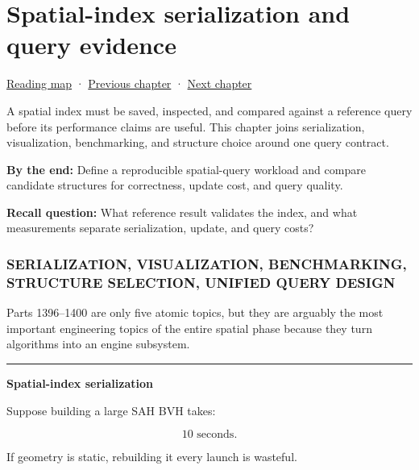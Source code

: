 \chapter{Spatial-index serialization and query evidence}\label{06-engine-ii-ch031-spatial-index-serialization-and-query-evidence}\hypertarget{06-engine-ii-ch031}{}\label{stagechapter:06-engine-ii-ch031}

\hypertarget{06-engine-ii-ch031-spatial-index-serialization-and-query-evidence}{}

\hyperref[volume-reading-map]{Reading map} · \hyperref[06-engine-ii-ch029]{Previous chapter} · \hyperref[06-engine-ii-ch033]{Next chapter}

A spatial index must be saved, inspected, and compared against a reference query before its performance claims are useful. This chapter joins serialization, visualization, benchmarking, and structure choice around one query contract.

\textbf{By the end:} Define a reproducible spatial-query workload and compare candidate structures for correctness, update cost, and query quality.

\textbf{Recall question:} What reference result validates the index, and what measurements separate serialization, update, and query costs?

\subsection{SERIALIZATION, VISUALIZATION, BENCHMARKING, STRUCTURE SELECTION, UNIFIED QUERY DESIGN}\label{06-engine-ii-ch031-serialization-visualization-benchmarking-structure-selection-unified-query-design}

\hypertarget{06-engine-ii-ch031-serialization-visualization-benchmarking-structure-selection-unified-query-design}{}

Parts 1396--1400 are only five atomic topics, but they are arguably the most important engineering topics of the entire spatial phase because they turn algorithms into an engine subsystem.

\begin{center}\rule{0.5\linewidth}{0.5pt}\end{center}

\textbf{Spatial-index serialization}

Suppose building a large SAH BVH takes:

\[
10\text{ seconds}.
\]

If geometry is static, rebuilding it every launch is wasteful.

